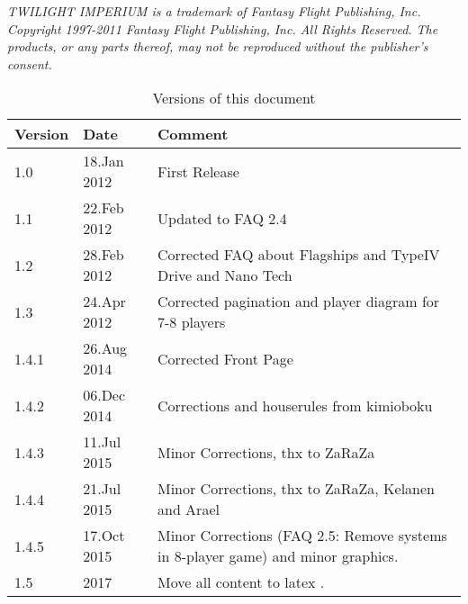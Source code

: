 \documentclass[11pt,fleqn]{book} %
\begin{document}
\noindent \textit{TWILIGHT IMPERIUM is a trademark of Fantasy Flight Publishing, Inc. Copyright 1997-2011 Fantasy Flight Publishing, Inc. All Rights Reserved. The products, or any parts thereof, may not be reproduced without the publisher's consent.} %


\begin{table}[!htbp]
\centering
\caption{Versions of this document}
\label{docversions}
\begin{tabular}{|l l l|}
Version & Date        & Comment                                                                          \\
\hline
1.0     & 18.Jan 2012 & First Release                                                                    \\
1.1     & 22.Feb 2012 & Updated to FAQ 2.4                                                               \\
1.2     & 28.Feb 2012 & Corrected FAQ about Flagships and TypeIV Drive and Nano Tech                     \\
1.3     & 24.Apr 2012 & Corrected pagination and player diagram for 7-8 players                          \\
1.4.1   & 26.Aug 2014 & Corrected Front Page                                                             \\
1.4.2   & 06.Dec 2014 & Corrections and houserules from kimioboku                                        \\
1.4.3   & 11.Jul 2015 & Minor Corrections, thx to ZaRaZa                                                 \\
1.4.4   & 21.Jul 2015 & Minor Corrections, thx to ZaRaZa, Kelanen and Arael                              \\
1.4.5   & 17.Oct 2015 & Minor Corrections (FAQ 2.5: Remove systems in 8-player game) and minor graphics. \\
1.5     &  2017       & Move all content to latex . \\
\end{tabular}
\end{table}


\pagestyle{empty} %
\end{document}
